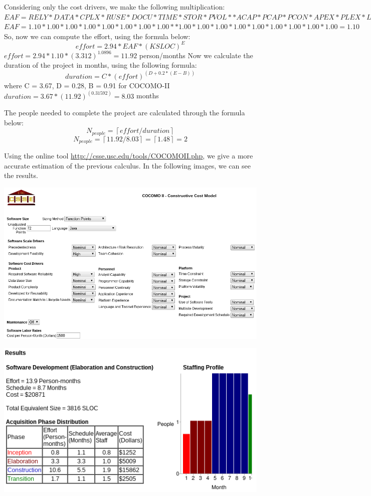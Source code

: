 	
	\noindent Considering only the cost drivers, we make the following multiplication:
	\newline
	\newline
	$EAF=RELY*DATA*CPLX*RUSE*DOCU*TIME*STOR*PVOL*
	*ACAP*PCAP*PCON*APEX*PLEX*LTEX*TOOL*SITE*SCED$
	\newline
	\newline
	$EAF=1.10*1.00*1.00*1.00*1.00*1.00*1.00*1.00*
	*1.00*1.00*1.00*1.00*1.00*1.00*1.00*1.00*1.00=1.10$
	\newline
	\newline
	So, now we can compute the effort, using the formula below:
	$$effort=2.94*EAF*(KSLOC)^E$$
	$effort=2.94*1.10*(3.312)^1.0896 = 11.92$ person/months
	\newline
	\newline
	Now we calculate the duration of the project in months, using the following formula:
	$$duration = C*(effort)^(D+0.2*(E-B))$$ where C = 3.67, D = 0.28, B = 0.91 for COCOMO-II
	$duration = 3.67*(11.92)^(0.31592) = 8.03$ months
	\newline
	\newline
	
	\noindent The people needed to complete the project are calculated through the formula below:
	$$N_{people} = \left \lceil{effort/duration}\right \rceil $$
	$$N_{people} = \left \lceil{11.92/8.03}\right \rceil = \left \lceil{1.48}\right \rceil = 2$$
	
	\newpage
	Using the online tool \url{http://csse.usc.edu/tools/COCOMOII.php}, we give a more accurate estimation of the previous calculus. In the following images, we can see the results.  
	
	\begin{center}
			\includegraphics[width=1\textwidth]{./images/cocomo1.png}
	\end{center}
	
	\begin{center}
			\includegraphics[width=1\textwidth]{./images/cocomo2.png}
	\end{center}
	 